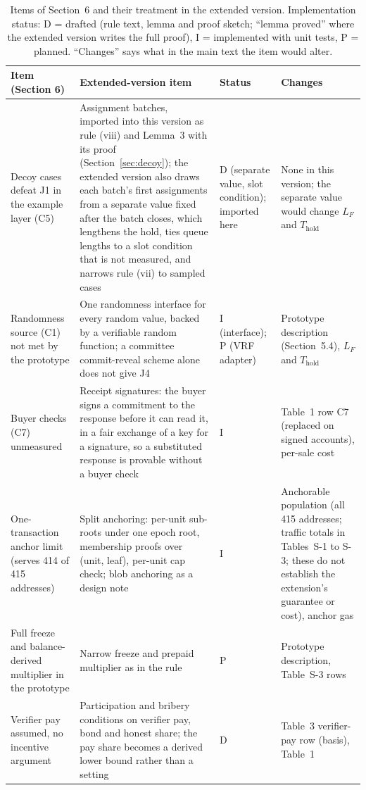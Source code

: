 \documentclass[10pt,a4paper]{article}
\newcommand{\Thold}{T_{\mathrm{hold}}}
\theoremstyle{plain}
\theoremstyle{remark}
\begin{document}
\begin{table}[!htbp]
\centering
\caption{Items of Section~6 and their treatment in the extended version. Implementation status: D = drafted (rule text, lemma and proof sketch; ``lemma proved'' where the extended version writes the full proof), I = implemented with unit tests, P = planned. ``Changes'' says what in the main text the item would alter.}
\label{tab:status}
\small
\begin{tabular}{@{}p{3.4cm}p{6.4cm}p{1.2cm}p{4.0cm}@{}}
\toprule
Item (Section 6) & Extended-version item & Status & Changes \\
\midrule
Decoy cases defeat J1 in the example layer (C5) & Assignment batches, imported into this version as rule (viii) and Lemma~3 with its proof (Section~\ref{sec:decoy}); the extended version also draws each batch's first assignments from a separate value fixed after the batch closes, which lengthens the hold, ties queue lengths to a slot condition that is not measured, and narrows rule (vii) to sampled cases & D (separate value, slot condition); imported here & None in this version; the separate value would change $L_F$ and $\Thold$ \\
Randomness source (C1) not met by the prototype & One randomness interface for every random value, backed by a verifiable random function; a committee commit-reveal scheme alone does not give J4 & I (interface); P (VRF adapter) & Prototype description (Section~5.4), $L_F$ and $\Thold$ \\
Buyer checks (C7) unmeasured & Receipt signatures: the buyer signs a commitment to the response before it can read it, in a fair exchange of a key for a signature, so a substituted response is provable without a buyer check & I & Table~1 row C7 (replaced on signed accounts), per-sale cost \\
One-transaction anchor limit (serves 414 of 415 addresses) & Split anchoring: per-unit sub-roots under one epoch root, membership proofs over (unit, leaf), per-unit cap check; blob anchoring as a design note & I & Anchorable population (all 415 addresses; traffic totals in Tables~S-1 to S-3; these do not establish the extension's guarantee or cost), anchor gas \\
Full freeze and balance-derived multiplier in the prototype & Narrow freeze and prepaid multiplier as in the rule & P & Prototype description, Table~S-3 rows \\
Verifier pay assumed, no incentive argument & Participation and bribery conditions on verifier pay, bond and honest share; the pay share becomes a derived lower bound rather than a setting & D & Table~3 verifier-pay row (basis), Table~1 \\

\end{tabular}
\end{table}
\end{document}

